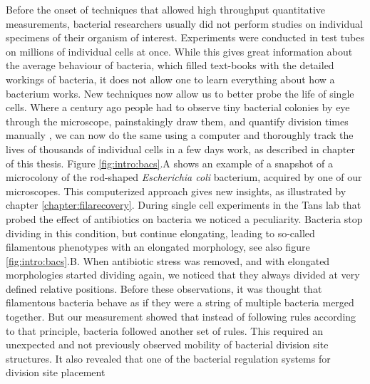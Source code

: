 %
%
Before the onset of techniques that allowed high throughput quantitative measurements, bacterial researchers usually did not perform studies on individual specimens of their organism of interest.
%
Experiments 
were conducted in test tubes on millions of individual cells at once.
%
While this gives great information about the average behaviour of bacteria, 
which filled text-books with the detailed workings of bacteria,
it does not allow one to learn everything about how a bacterium works.
%
%
New techniques now allow us to better probe the life of single cells.
%
Where a century ago people had to observe tiny bacterial colonies by eye through the microscope, painstakingly draw them, and quantify division times manually \cite{Kelly1932},
we can now do the same using a computer and 
thoroughly track the lives of thousands of individual cells in a few days work, as described in chapter \cite{chapter:methods} of this thesis.
%
Figure \ref{fig:intro:bacs}.A shows an example of a snapshot of a microcolony of the rod-shaped \textit{Escherichia coli} bacterium, acquired by one of our microscopes.
%
This computerized approach gives new insights, as illustrated by chapter \ref{chapter:filarecovery}.
%
During single cell experiments in the Tans lab that probed the effect of antibiotics on \ecoli bacteria \cite{RozendaalVerslagXXX} we noticed a peculiarity.
%
Bacteria stop dividing in this condition, but continue elongating, leading to so-called filamentous phenotypes with an elongated morphology, see also figure \ref{fig:intro:bacs}.B.
%
When antibiotic stress was removed, and \ecoli with elongated morphologies started dividing again, 
we noticed that 
they always divided at very defined relative positions.
%
Before these observations, it was thought that filamentous bacteria behave as if they were a string of multiple bacteria merged together.
%
But our measurement showed that instead of following rules according to that principle, 
bacteria followed another set of rules.
%
This required an unexpected and not previously observed mobility 
of bacterial division site structures.
It also revealed that 
one of the bacterial regulation systems for division site placement
